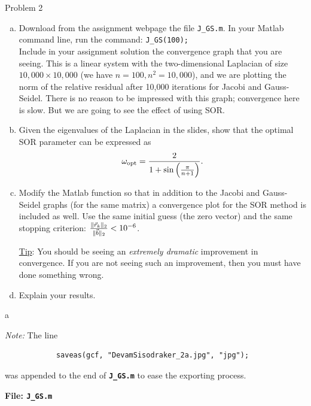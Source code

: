 \begin{section}{Problem 2}
    \begin{problem}{2}
        \begin{enumerate}[(a)]
            \item Download from the assignment webpage the file {\tt J\_GS.m}. In your {\sc Matlab} command line, run the command: {\tt J\_GS(100);} \\
            Include in your assignment solution the convergence graph that you are seeing. This is a linear system with the two-dimensional Laplacian of size $10,000 \times 10,000$ (we have $n=100, n^2=10,000$), and we are plotting the norm of the relative residual after 10,000 iterations for Jacobi and Gauss-Seidel. There is no reason to be impressed with this graph; convergence here is slow. But we are going to see  the effect of using SOR.
            \item Given the eigenvalues of the Laplacian in the slides, show that the optimal SOR parameter can be expressed as
            $$ \omega_{\rm opt} = \frac{2}{1+\sin \left( \frac{\pi}{n+1} \right)}.$$
            \item
            Modify the  {\sc Matlab} function so that in addition to the Jacobi and Gauss-Seidel graphs (for the same matrix) a convergence plot for the SOR method is included as well. Use the same initial guess (the zero vector) and the same stopping criterion: $\frac{\| \vec{r}_k \|_2}{\| \vec{b} \|_2} < 10^{-6}$. 
            
            {\underline {Tip}:} You should be seeing an {\em extremely dramatic} improvement in convergence. If you are not seeing such an improvement, then you must have done something wrong.
            \item Explain your results. 
        \end{enumerate}
    \end{problem}

    \newpage

    \begin{solution}{a}

        \textit{Note:} The line \begin{verbatim}
            saveas(gcf, "DevamSisodraker_2a.jpg", "jpg");
        \end{verbatim} 
        was appended to the end of \textbf{{\tt J\_GS.m}} to ease the exporting process.
        \begin{mdframed}
            \footnotesize
            \textbf{File: {\tt J\_GS.m}}
            \inputminted{matlab}{J_GS.m}
            \normalfont
        \end{mdframed}


\end{solution}
\end{section}
